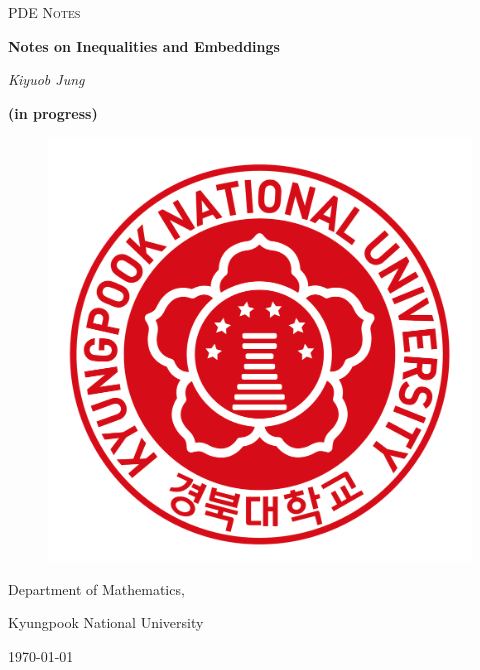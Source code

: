 \documentclass[11pt,a4paper]{report}
\theoremstyle{definition}
\begin{document}
\begin{titlepage}
	\centering
	{\scshape\LARGE PDE Notes \par}
	\vspace{1cm}
	{\scshape\Large \par}
	\vspace{1.5cm}
	{\huge\bfseries Notes on Inequalities and Embeddings\par}
	\vspace{2cm}
	{\Large\itshape Kiyuob Jung\par}
	\vspace{2cm}
	{\Large\bfseries (in progress)\par}
	\vspace{5cm}
	
	\begin{figure}[H] 
	\centering 
	\includegraphics[scale=0.4]{Illustration/Logo.png} 
	\end{figure}
	\vspace{2cm}

	Department of Mathematics,\par
	Kyungpook National University
	
	\vfill

	{\large \today\par}
\end{titlepage}
\end{document}
